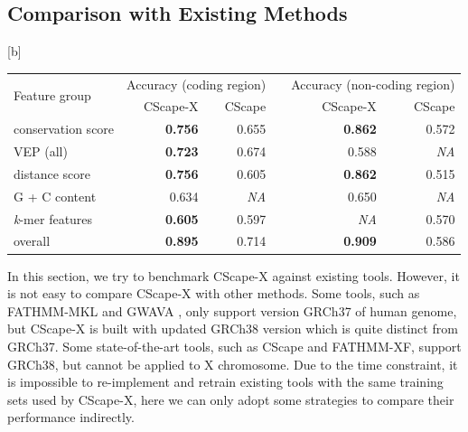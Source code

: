 \documentclass[a4paper,nohyper,nobib,openany,justified]{tufte-book}
\makeatletter
\renewenvironment{table}[1][htbp]{%
  \@tufte@orig@float{table}[#1]%
}{%
  \@tufte@orig@endfloat
}
\makeatother
\begin{document}
\begin{fullwidth}
\section{Comparison with Existing Methods}

\begin{table}[b]
        \begin{center}
        \begin{tabular}{lrrcrr}
        \toprule
         \multirow{2}{*}{Feature group}&\multicolumn{2}{c}{Accuracy (coding region)} & &\multicolumn{2}{c}{Accuracy (non-coding region)}\\
        \cmidrule(r){2-3}
        \cmidrule(r){5-6}
        & CScape-X & CScape & \quad & CScape-X & CScape \\
        \midrule
        conservation score    & \textbf{0.756} & 0.655 & & \textbf{0.862} & 0.572 \\
        VEP (all)             & \textbf{0.723} & 0.674 & & 0.588 & \emph{NA}  \\
        distance score        & \textbf{0.756} & 0.605 & & \textbf{0.862} & 0.515  \\
        G + C content         & 0.634 & \emph{NA} & & 0.650   & \emph{NA} \\
        \emph{k}-mer features & \textbf{0.605} & 0.597 & & \emph{NA} & 0.570   \\
        overall               & \textbf{0.895} & 0.714 & & \textbf{0.909} & 0.586 \\
        \bottomrule
        \end{tabular}
        \end{center}
    \caption{Accuracy of the similar feature groups employed by CScape and CScape-X. The results of CScape are calculated from LOO-CV and collected from its original paper. And the results of CScape-X is calculated from 10-fold CV. Bold numbers indicate the higher values.}
    \label{tab:compare}
\end{table}

In this section, we try to benchmark CScape-X against existing tools. However, it is not easy to compare CScape-X with other methods. Some tools, such as FATHMM-MKL and GWAVA \cite{Ritchie2014}, only support version GRCh37 of human genome, but CScape-X is built with updated GRCh38 version which is quite distinct from GRCh37. Some state-of-the-art tools, such as CScape and FATHMM-XF, support GRCh38, but cannot be applied to X chromosome. Due to the time constraint, it is impossible to re-implement and retrain existing tools with the same training sets used by CScape-X, here we can only adopt some strategies to compare their performance indirectly.


\end{fullwidth}
\end{document}
